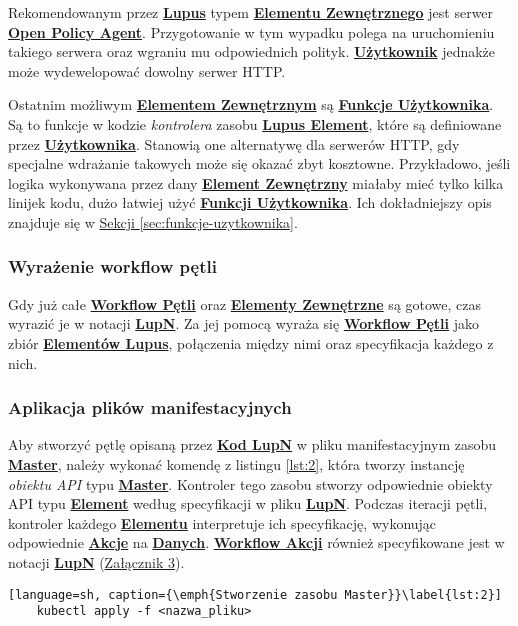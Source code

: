 Rekomendowanym przez \hyperlink{def:lupus}{\textbf{Lupus}} typem \hyperlink{def:element-zewnetrzny}{\textbf{Elementu Zewnętrznego}} jest serwer \hyperlink{def:opa}{\textbf{Open Policy Agent}}. Przygotowanie w tym wypadku polega na uruchomieniu takiego serwera oraz wgraniu mu odpowiednich polityk. \hyperlink{def:uzytkownik}{\textbf{Użytkownik}} jednakże może wydewelopować dowolny serwer HTTP.

Ostatnim możliwym \hyperlink{def:element-zewnetrzny}{\textbf{Elementem Zewnętrznym}} są \hyperlink{def:funkcje-uzytkownika}{\textbf{Funkcje Użytkownika}}. Są to funkcje w kodzie \textit{kontrolera} zasobu \hyperlink{def:element-lupus}{\textbf{Lupus Element}}, które są definiowane przez \hyperlink{def:uzytkownik}{\textbf{Użytkownika}}. Stanowią one alternatywę dla serwerów HTTP, gdy specjalne wdrażanie takowych może się okazać zbyt kosztowne. Przykładowo, jeśli logika wykonywana przez dany \hyperlink{def:element-zewnetrzny}{\textbf{Element Zewnętrzny}} miałaby mieć tylko kilka linijek kodu, dużo łatwiej użyć \hyperlink{def:funkcje-uzytkownika}{\textbf{Funkcji Użytkownika}}. Ich dokładniejszy opis znajduje się w \hyperref[sec:funkcje-uzytkownika]{Sekcji \ref{sec:funkcje-uzytkownika}}.


\subsubsection{Wyrażenie workflow pętli}

Gdy już całe \hyperlink{def:workflow-petli}{\textbf{Workflow Pętli}} oraz \hyperlink{def:element-zewnetrzny}{\textbf{Elementy Zewnętrzne}} są gotowe, czas wyrazić je w notacji \hyperlink{def:lupn}{\textbf{LupN}}. Za jej pomocą wyraża się \hyperlink{def:workflow-petli}{\textbf{Workflow Pętli}} jako zbiór \hyperlink{def:element-lupus}{\textbf{Elementów Lupus}}, połączenia między nimi oraz specyfikacja każdego z nich.

\subsubsection{Aplikacja plików manifestacyjnych}

Aby stworzyć pętlę opisaną przez \hyperlink{def:kod-lupn}{\textbf{Kod LupN}} w pliku manifestacyjnym zasobu \hyperlink{def:master}{\textbf{Master}}, należy wykonać komendę z listingu \ref{lst:2}, która tworzy instancję \textit{obiektu API} typu \hyperlink{def:master}{\textbf{Master}}. Kontroler tego zasobu stworzy odpowiednie obiekty API typu \hyperlink{def:element}{\textbf{Element}} według specyfikacji w pliku \hyperlink{def:plik-lupn}{\textbf{LupN}}. Podczas iteracji pętli, kontroler każdego \hyperlink{def:element}{\textbf{Elementu}} interpretuje ich specyfikację, wykonując odpowiednie \hyperlink{def:akcja}{\textbf{Akcje}} na \hyperlink{def:dane}{\textbf{Danych}}. \hyperlink{def:workflow-petli}{\textbf{Workflow Akcji}} również specyfikowane jest w notacji \hyperlink{def:lupn}{\textbf{LupN}} (\hyperref[appendix:3]{Załącznik 3}).

\begin{lstlisting}[language=sh, caption={\emph{Stworzenie zasobu Master}}\label{lst:2}]
    kubectl apply -f <nazwa_pliku>
\end{lstlisting}
